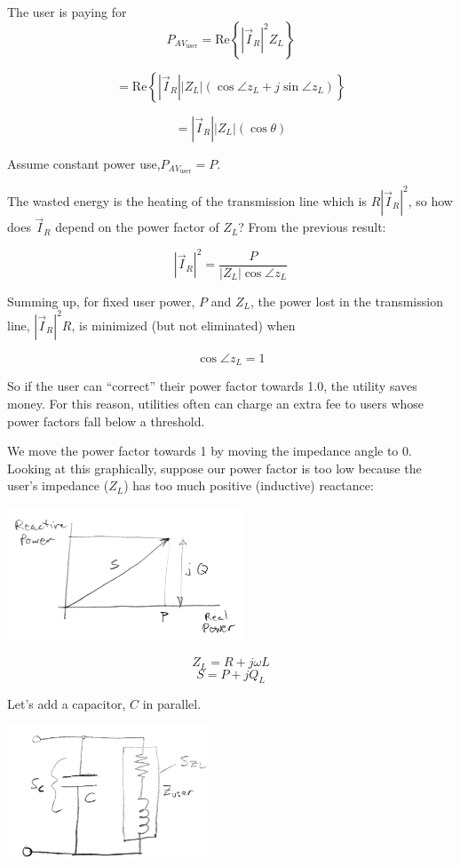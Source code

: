 The user is paying for
\[
P_{AV_{\text{user}}} = \text{Re}\left\{ |\vec{I}_R|^2 Z_L \right\}
\]

\[
= \text{Re}\left\{ |\vec{I}_R| |Z_L| (\cos \angle z_L + j \sin \angle z_L) \right\}
\]

\[
= |\vec{I}_R| |Z_L| (\cos \theta)
\]

\noindent Assume constant power use,$P_{AV_{\text{user}}} = P$.

The wasted energy is the heating of the transmission line which is  $R|\vec{I}_R|^2$,
so how does $\vec{I}_R$ depend on the power factor of $Z_L$?
From the previous result:

\[
|\vec{I}_R|^2 = \frac{P}{|Z_L| \cos \angle z_L}
\]

Summing up, for fixed user power, $P$ and $Z_L$, the power lost in
the transmission line, $|\vec{I}_R|^2 R$, is minimized (but not eliminated) when

\[
\cos \angle z_L = 1
\]

So if the user can ``correct'' their power factor towards 1.0,
the utility saves money.
For this reason, utilities often can charge
an extra fee to users whose power factors fall below a  threshold.

We move the power factor towards 1 by moving the
impedance angle to 0.
Looking at this graphically, suppose our power factor is too low because
the user's impedance ($Z_L$) has too much positive (inductive) reactance:

\vspace{0.15in}
\includegraphics[width=70mm]{figsChapt03/KM41864.png}

\[
Z_L = R + j\omega L
\]
\[
S = P + jQ_L
\]



Let's add a capacitor, $ C$  in parallel.

\vspace{0.1in}
\includegraphics[width=60mm]{figsChapt03/ID44718.png}
\vspace{0.1in}

